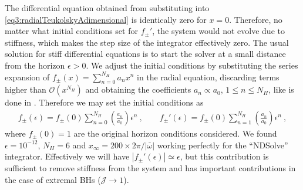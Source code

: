 The differential equation obtained from substituting  into \eqref{eq3:radialTeukolskyAdimensional} is identically zero for $x=0$.
Therefore, no matter what initial conditions set for $f_{\pm}{\!}'$, the system would not evolve due to stiffness, which makes the step size of the integrator effectively zero.
The usual solution for stiff differential equations is to start the solver at a small distance from the horizon $\epsilon>0$.
We adjust the initial conditions by substituting the series expansion of $f_{\pm}(x) = \sum_{n=0}^{N_H} a_n x^n$ in the radial equation, discarding terms higher than $\mathscr{O}(x^{N_H})$ and obtaining the coefficients $a_n \propto a_0$, $1 \le n \le N_H$, like is done in \cite{Rosa2017}. 
Therefore we may set the initial conditions as
\begin{align}
	f_{\pm}(\epsilon) = f_{\pm}(0) \sum_{n=0}^{N_H} \left(\frac{a_n}{a_0}\right) \epsilon^n ~,\qquad f_{\pm}{\!}'(\epsilon) = f_{\pm}(0) \sum_{n=1}^{N_H} \left(\frac{a_n}{a_0}\right) \epsilon^n ~,
\end{align}
where $f_{\pm}(0)=1$ are the original horizon conditions considered.
We found $\epsilon=10^{-12}$, $N_H=6$ and $x_\infty = 200 \times 2\pi/|\bar{\omega}|$ working perfectly for the ``NDSolve'' integrator.
Effectively we will have $|f_{\pm}{\!}'(\epsilon)|\simeq \epsilon$, but this contribution is sufficient to remove stiffness from the system and has important contributions in the case of extremal BHs ($\mathscr{J}\to 1$).

